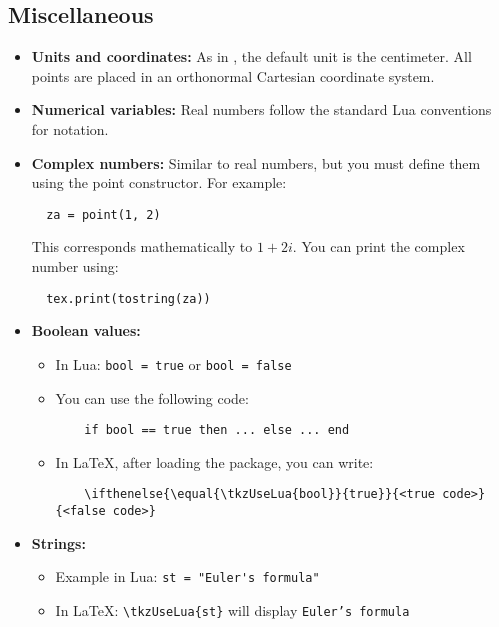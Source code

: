 \subsection{Miscellaneous}
\label{sub:miscellanous}
\begin{itemize}
  \item \textbf{Units and coordinates:} As in , the default unit is the centimeter. All points are placed in an orthonormal Cartesian coordinate system.

  \item \textbf{Numerical variables:} Real numbers follow the standard Lua conventions for notation.

  \item \textbf{Complex numbers:} Similar to real numbers, but you must define them using the point constructor. For example:
  \begin{verbatim}
  za = point(1, 2)
  \end{verbatim}
  This corresponds mathematically to \(1 + 2i\). You can print the complex number using:
  \begin{verbatim}
  tex.print(tostring(za))
  \end{verbatim}

  \item \textbf{Boolean values:}
  \begin{itemize}
    \item In Lua: \verb|bool = true| or \verb|bool = false|
    \item You can use the following  code:
    \begin{verbatim}
    if bool == true then ... else ... end
    \end{verbatim}
    \item In LaTeX, after loading the  package, you can write:
    \begin{verbatim}
    \ifthenelse{\equal{\tkzUseLua{bool}}{true}}{<true code>}{<false code>}
    \end{verbatim}
  \end{itemize}

  \item \textbf{Strings:}
  \begin{itemize}
    \item Example in Lua: \verb|st = "Euler's formula"|
    \item In LaTeX: \verb|\tkzUseLua{st}| will display \texttt{Euler's formula}
  \end{itemize}
\end{itemize}
\endinput